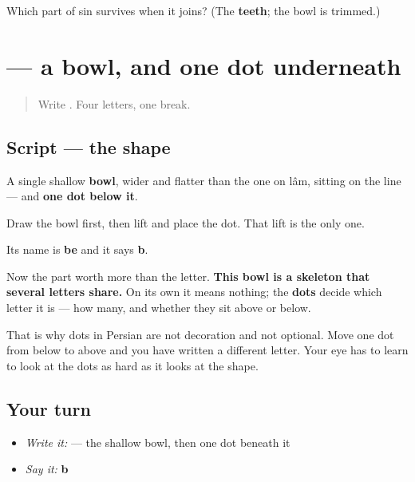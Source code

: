 \begin{tcolorbox}[breakable,colback=teal!4,colframe=teal!35!black,title={Before you move on}]
Which part of sin survives when it joins? (The \textbf{teeth}; the bowl is trimmed.)
\end{tcolorbox}
\section[\texorpdfstring{\fa{ب} (be)}{ب (be)}]{ — a bowl, and one dot underneath}

\label{lesson:FA-W15-be}



\begin{quote}
Write . Four letters, one break.
\end{quote}

\subsection*{Script — the shape}

\begin{quote}
\end{quote}

A single shallow \textbf{bowl}, wider and flatter than the one on lâm, sitting on the line — and \textbf{one dot below it}.

Draw the bowl first, then lift and place the dot. That lift is the only one.

Its name is \textbf{be} and it says \textbf{b}.

Now the part worth more than the letter. \textbf{This bowl is a skeleton that several letters share.} On its own it means nothing; the \textbf{dots} decide which letter it is — how many, and whether they sit above or below.

That is why dots in Persian are not decoration and not optional. Move one dot from below to above and you have written a different letter. Your eye has to learn to look at the dots as hard as it looks at the shape.

\subsection*{Your turn}
\begin{itemize}
\raggedright
  \item \emph{Write it:}  — the shallow bowl, then one dot beneath it
  \item \emph{Say it:} \textbf{b}
\end{itemize}

